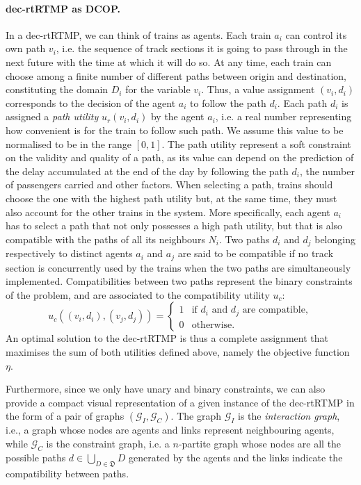 \paragraph{dec-rtRTMP as DCOP.} In a dec-rtRTMP, we can think of trains as agents. Each train $a_i$ can control its own path $v_i$, i.e. the sequence of track sections it is going to pass through in the next future with the time at which it will do so. At any time, each train can choose among a finite number of different paths between origin and destination, constituting the domain $D_i$ for the variable $v_i$. Thus, a value assignment $(v_i, d_i)$ corresponds to the decision of the agent $a_i$ to follow the path $d_i$.
Each path $d_i$ is assigned a \emph{path utility} $u_r(v_i, d_i)$ by the agent $a_i$, i.e. a real number representing how convenient is for the train to follow such path. We assume this value to be normalised to be in the range $[0,1]$. The path utility represent a soft constraint on the validity and quality of a path, as its value can depend on the prediction of the delay accumulated at the end of the day by following the path $d_i$, the number of passengers carried and other factors. When selecting a path, trains should choose the one with the highest path utility but, at the same time, they must also account for the other trains in the system. More specifically, each agent $a_i$ has to select a path that not only possesses a high path utility, but that is also compatible with the paths of all its neighbours $N_i$. Two paths $d_i$ and $d_j$ belonging respectively to distinct agents $a_i$ and $a_j$ are said to be compatible if no track section is concurrently used by the trains when the two paths are simultaneously implemented. Compatibilities between two paths represent the binary constraints of the problem, and are associated to the compatibility utility $u_c$:
$$
u_c( (v_i, d_i), (v_j, d_j) ) = 
\begin{cases}
    1     & \text{if $d_i$ and $d_j$ are compatible}, \\
    0     & \text{otherwise}.
\end{cases}
$$
An optimal solution to the dec-rtRTMP is thus a complete assignment that maximises the sum of both utilities defined above, namely the objective function $\eta$.


Furthermore, since we only have unary and binary constraints, we can also provide a compact visual representation of a given instance of the dec-rtRTMP in the form of a pair of graphs $(\mathcal{G}_I, \mathcal{G}_C)$. The graph $\mathcal{G}_I$ is the \emph{interaction graph}, i.e., a graph whose nodes are agents and links represent neighbouring agents, while $\mathcal{G}_C$ is the constraint graph, i.e. a $n$-partite graph whose nodes are all the possible paths $d \in \bigcup_{D \in \mathfrak{D}} D$ generated by the agents and the links indicate the compatibility between paths. 

